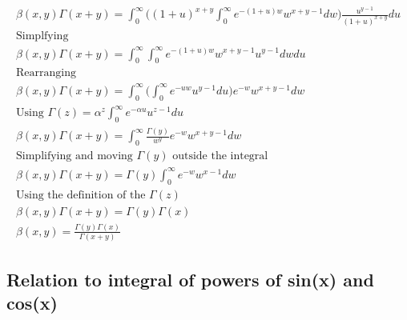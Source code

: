 \documentclass[a4paper]{article}
\begin{document}
\begin{theorem}
\begin{gather*}
            \beta(x, y) \Gamma(x+y) =
            \int_{0}^{\infty}  \Big( (1+u)^{x+y} \int_{0}^{\infty} e^{-(1+u) w} w^{x+y-1} dw \Big) \frac{u^{y-1}}{(1+u)^{x+y}} du
            \\
            \text{Simplfying}
            \\
            \beta(x, y) \Gamma(x+y) =
            \int_{0}^{\infty} \int_{0}^{\infty} e^{-(1+u) w} w^{x+y-1}  u^{y-1} dw du
            \\
            \text{Rearranging}
            \\
            \beta(x, y) \Gamma(x+y) =
            \int_{0}^{\infty} \Big( \int_{0}^{\infty} e^{-uw} u^{y-1} du \Big) e^{-w} w^{x+y-1} dw
            \\
            \text{Using $\Gamma(z) = \alpha^z  \int_{0}^{\infty} e^{-\alpha u} u^{z-1} du$}
            \\
            \beta(x, y) \Gamma(x+y) =
            \int_{0}^{\infty} \frac{\Gamma(y)}{w^y}  e^{-w} w^{x+y-1} dw
            \\
            \text{Simplifying and moving $\Gamma(y)$ outside the integral}
            \\
            \beta(x, y) \Gamma(x+y) = \Gamma(y)
            \int_{0}^{\infty} e^{-w} w^{x-1} dw
            \\
            \text{Using the definition of the $\Gamma(z)$}
            \\
            \beta(x, y) \Gamma(x+y) = \Gamma(y) \Gamma(x)
            \\
            \beta(x, y)  =\frac{\Gamma(y) \Gamma(x)}{\Gamma(x+y)}
        \end{gather*}
    \end{theorem}

    \subsection{Relation to integral of powers of sin(x) and cos(x)}\label{gf:subsec:relation-to-integral-of-powers-of-sin(x)-and-cos(x)}
\end{document}
